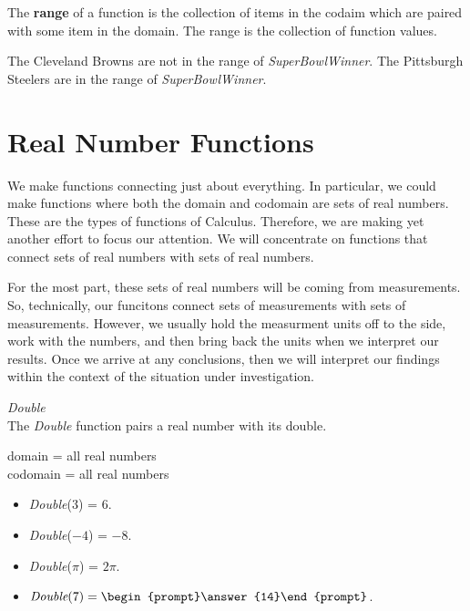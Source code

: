 \documentclass{ximera}
\begin{document}
The \textbf{range} of a function is the collection of items in the codaim which are paired with some item in the domain.  The range is the collection of function values.

The Cleveland Browns are not in the range of \textit{SuperBowlWinner}.  The Pittsburgh Steelers are in the range of \textit{SuperBowlWinner}.






\section{Real Number Functions}

We make functions connecting just about everything.  In particular, we could make functions where both the domain and codomain are sets of real numbers. These are the types of functions of Calculus.  Therefore, we are making yet another effort to focus our attention.  We will concentrate on functions that connect sets of real numbers with sets of real numbers.

For the most part, these sets of real numbers will be coming from measurements.  So, technically, our funcitons connect sets of measurements with sets of measurements. However, we usually hold the measurment units off to the side, work with the numbers, and then bring back the units when we interpret our results.  Once we arrive at any conclusions, then we will interpret our findings within the context of the situation under investigation.




\begin{question} \textit{Double} \\
The \textit{Double} function pairs a real number with its double.

domain = all real numbers  \\ 
codomain = all real numbers


\begin{itemize}
\item \textit{Double}($3$) = $6$.
\item \textit{Double}($-4$) = $-8$.
\item \textit{Double}($\pi$) = $2 \pi$.

\item $\textit{Double}(7) = \begin{prompt}\answer{14}\end{prompt}$.
\end{itemize}

\end{question} 
\end{document}
